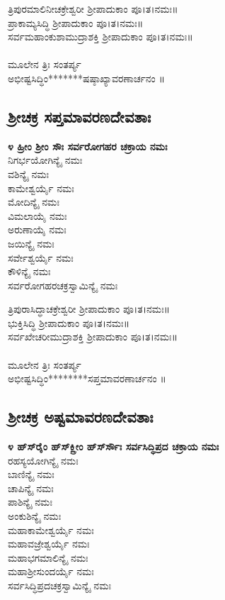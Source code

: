  ತ್ರಿಪುರಮಾಲಿನೀಚಕ್ರೇಶ್ವರೀ ಶ್ರೀಪಾದುಕಾಂ ಪೂ।ತ।ನಮಃ॥\\
 ಪ್ರಾಕಾಮ್ಯಸಿದ್ಧಿ ಶ್ರೀಪಾದುಕಾಂ ಪೂ।ತ।ನಮಃ॥\\
 ಸರ್ವಮಹಾಂಕುಶಾಮುದ್ರಾಶಕ್ತಿ ಶ್ರೀಪಾದುಕಾಂ ಪೂ।ತ।ನಮಃ॥\\
\\
ಮೂಲೇನ ತ್ರಿಃ ಸಂತರ್ಪ್ಯ\\
 ಅಭೀಷ್ಟಸಿದ್ಧಿಂ*******ಷಷ್ಠಾಖ್ಯಾವರಣಾರ್ಚನಂ ॥
\subsection{ಶ್ರೀಚಕ್ರ ಸಪ್ತಮಾವರಣದೇವತಾಃ}
{\bfseries ೪ ಹ್ರೀಂ ಶ್ರೀಂ ಸೌಃ ಸರ್ವರೋಗಹರ ಚಕ್ರಾಯ ನಮಃ}\\
ನಿಗರ್ಭಯೋಗಿನ್ಯೈ ನಮಃ\\
 ವಶಿನ್ಯೈ ನಮಃ\\
 ಕಾಮೇಶ್ವರ್ಯೈ ನಮಃ\\
 ಮೋದಿನ್ಯೈ ನಮಃ\\
 ವಿಮಲಾಯೈ ನಮಃ\\
 ಅರುಣಾಯೈ ನಮಃ\\
 ಜಯಿನ್ಯೈ ನಮಃ\\
 ಸರ್ವೇಶ್ವರ್ಯೈ ನಮಃ\\
 ಕೌಳಿನ್ಯೈ ನಮಃ\\
 ಸರ್ವರೋಗಹರಚಕ್ರಸ್ವಾಮಿನ್ಯೈ ನಮಃ

 ತ್ರಿಪುರಾಸಿದ್ಧಾಚಕ್ರೇಶ್ವರೀ ಶ್ರೀಪಾದುಕಾಂ ಪೂ।ತ।ನಮಃ॥\\
 ಭುಕ್ತಿಸಿದ್ಧಿ ಶ್ರೀಪಾದುಕಾಂ ಪೂ।ತ।ನಮಃ॥\\
 ಸರ್ವಖೇಚರೀಮುದ್ರಾಶಕ್ತಿ ಶ್ರೀಪಾದುಕಾಂ ಪೂ।ತ।ನಮಃ॥\\
\\
ಮೂಲೇನ ತ್ರಿಃ ಸಂತರ್ಪ್ಯ\\
 ಅಭೀಷ್ಟಸಿದ್ಧಿಂ********ಸಪ್ತಮಾವರಣಾರ್ಚನಂ ॥
\subsection{ಶ್ರೀಚಕ್ರ ಅಷ್ಟಮಾವರಣದೇವತಾಃ}
{\bfseries ೪ ಹ್‌ಸ್‌ರೈಂ ಹ್‌ಸ್‌ಕ್ಲ್ರೀಂ ಹ್‌ಸ್‌ರ್ಸೌಃ ಸರ್ವಸಿದ್ಧಿಪ್ರದ ಚಕ್ರಾಯ ನಮಃ}\\
ರಹಸ್ಯಯೋಗಿನ್ಯೈ ನಮಃ\\
 ಬಾಣಿನ್ಯೈ ನಮಃ\\
 ಚಾಪಿನ್ಯೈ ನಮಃ\\
 ಪಾಶಿನ್ಯೈ ನಮಃ\\
 ಅಂಕುಶಿನ್ಯೈ ನಮಃ\\
 ಮಹಾಕಾಮೇಶ್ವರ್ಯೈ ನಮಃ\\
 ಮಹಾವಜ್ರೇಶ್ವರ್ಯೈ ನಮಃ\\
 ಮಹಾಭಗಮಾಲಿನ್ಯೈ ನಮಃ\\
 ಮಹಾಶ್ರೀಸುಂದರ್ಯೈ ನಮಃ\\
 ಸರ್ವಸಿದ್ಧಿಪ್ರದಚಕ್ರಸ್ವಾಮಿನ್ಯೈ ನಮಃ

